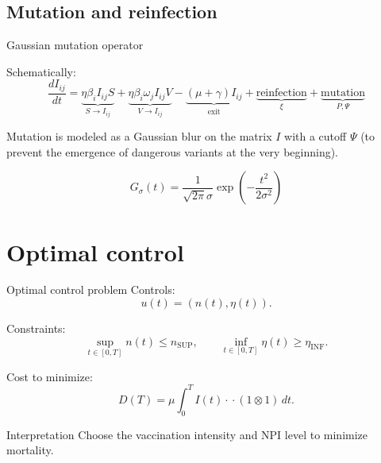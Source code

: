 \documentclass[
11pt,notheorems,hyperref={pdfauthor=whatever}
]{beamer}
\begin{document}
\subsection{Mutation and reinfection}

\begin{frame}{Gaussian mutation operator}

	Schematically:
	\[
		\frac{dI_{ij}}{dt}
		=
		\underbrace{\eta \beta_i I_{ij} S}_{S\to I_{ij}}
		+
		\underbrace{\eta \beta_i \omega_j I_{ij} V}_{V\to I_{ij}}
		-
		\underbrace{(\mu+\gamma)I_{ij}}_{\text{exit}}
		+
		\underbrace{\text{reinfection}}_{\xi}
		+
		\underbrace{\text{mutation}}_{P,\Psi}
	\]

	Mutation is modeled as a Gaussian blur on the matrix \(I\) with a cutoff $\Psi$ (to prevent the emergence of dangerous variants at the very beginning).

	\[
		G_\sigma(t)=\frac{1}{\sqrt{2\pi}\sigma}\exp\!\left(-\frac{t^2}{2\sigma^2}\right)
	\]


\end{frame}

%
%



\section{Optimal control}

\begin{frame}{Optimal control problem}
	Controls:
	\[
		u(t)=(n(t),\eta(t)).
	\]

	Constraints:
	\[
		\sup_{t\in[0,T]} n(t)\le n_{\mathrm{SUP}},
		\qquad
		\inf_{t\in[0,T]} \eta(t)\ge \eta_{\mathrm{INF}}.
	\]

	Cost to minimize:
	\[
		D(T)=\mu\int_0^T I(t)\cdot\!\cdot(1\otimes 1)\,dt.
	\]

	\begin{block}{Interpretation}
		Choose the vaccination intensity and NPI level to minimize mortality.
	\end{block}
\end{frame}
\end{document}
